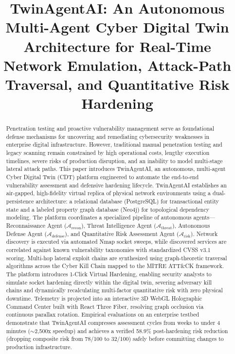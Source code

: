 \documentclass[conference]{IEEEtran}
\begin{document}
\title{TwinAgentAI: An Autonomous Multi-Agent Cyber Digital Twin Architecture for Real-Time Network Emulation, Attack-Path Traversal, and Quantitative Risk Hardening}

\author{
}

\maketitle

\begin{abstract}
Penetration testing and proactive vulnerability management serve as foundational defense mechanisms for uncovering and remediating cybersecurity weaknesses in enterprise digital infrastructure. However, traditional manual penetration testing and legacy scanning remain constrained by high operational costs, lengthy execution timelines, severe risks of production disruption, and an inability to model multi-stage lateral attack paths. This paper introduces TwinAgentAI, an autonomous, multi-agent Cyber Digital Twin (CDT) platform engineered to automate the end-to-end vulnerability assessment and defensive hardening lifecycle. TwinAgentAI establishes an air-gapped, high-fidelity virtual replica of physical network environments using a dual-persistence architecture: a relational database (PostgreSQL) for transactional entity state and a labeled property graph database (Neo4j) for topological dependency modeling. The platform coordinates a specialized pipeline of autonomous agents---Reconnaissance Agent ($\mathcal{A}_{\text{recon}}$), Threat Intelligence Agent ($\mathcal{A}_{\text{threat}}$), Autonomous Defense Agent ($\mathcal{A}_{\text{defense}}$), and Quantitative Risk Assessment Agent ($\mathcal{A}_{\text{risk}}$). Network discovery is executed via automated Nmap socket sweeps, while discovered services are correlated against known vulnerability taxonomies with standardized CVSS v3.1 scoring. Multi-hop lateral exploit chains are synthesized using graph-theoretic traversal algorithms across the Cyber Kill Chain mapped to the MITRE ATT\&CK framework. The platform introduces 1-Click Virtual Hardening, enabling security analysts to simulate socket hardening directly within the digital twin, severing adversary kill chains and dynamically recalculating multi-factor quantitative risk with zero physical downtime. Telemetry is projected into an interactive 3D WebGL Holographic Command Center built with React Three Fiber, resolving graph occlusion via continuous parallax rotation. Empirical evaluations on an enterprise testbed demonstrate that TwinAgentAI compresses assessment cycles from weeks to under 4 minutes ($\sim$2,500x speedup) and achieves a verified 58.9\% post-hardening risk reduction (dropping composite risk from 78/100 to 32/100) safely before committing changes to production infrastructure.
\end{abstract}
\end{document}
